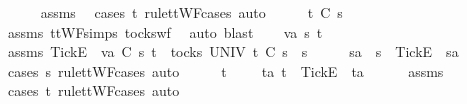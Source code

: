 \begin{isabellebody}
\ \ \ \ \isamarkupfalse%
\ assms{\isacharparenleft}{}{\isacharparenright}\ \isamarkupfalse%
\ {\isacharparenleft}cases\ t\ rule{\isacharcolon}ttWF{\isachardot}cases{\isacharcomma}\ auto{\isacharparenright}\isanewline
\ \ \isamarkupfalse%
\ \isamarkupfalse%
\ {\isachardoublequoteopen}t\ {\isasymle}\isactrlsub C\ s{}{\isacharprime}{\isachardoublequoteclose}\isanewline
\ \ \ \ \isamarkupfalse%
\ assms{\isacharparenleft}{}{\isacharparenright}\ ttWF{\isachardot}simps{\isacharparenleft}{}{\isacharparenright}\ tocks{\isacharunderscore}wf\ \isamarkupfalse%
\ {\isacharparenleft}auto{\isacharcomma}\ blast{\isacharparenright}\isanewline
{}\isamarkupfalse%
\isanewline
\ \ \isamarkupfalse%
\ va\ s{}{\isacharprime}\ t\isanewline
\ \ \isamarkupfalse%
\ assms{\isacharcolon}\ {\isachardoublequoteopen}{\isacharbrackleft}Tick{\isacharbrackright}\isactrlsub E\ {\isacharhash}\ va\ {\isasymsubseteq}\isactrlsub C\ s{}{\isacharprime}{\isachardoublequoteclose}\ {\isachardoublequoteopen}t\ {\isasymin}\ tocks\ UNIV{\isachardoublequoteclose}\ {\isachardoublequoteopen}t\ {\isasymle}\isactrlsub C\ s{}{\isacharprime}\ {\isacharat}\ s{}{\isachardoublequoteclose}\isanewline
\ \ \isamarkupfalse%
\ \isamarkupfalse%
\ s{}{\isacharprime}a\ \ {\isachardoublequoteopen}s{}{\isacharprime}\ {\isacharequal}\ {\isacharbrackleft}Tick{\isacharbrackright}\isactrlsub E\ {\isacharhash}\ s{}{\isacharprime}a{\isachardoublequoteclose}\isanewline
\ \ \ \ \isamarkupfalse%
\ {\isacharparenleft}cases\ s{}{\isacharprime}\ rule{\isacharcolon}ttWF{\isachardot}cases{\isacharcomma}\ auto{\isacharparenright}\isanewline
\ \ \isamarkupfalse%
\ \isamarkupfalse%
\ {\isachardoublequoteopen}t\ {\isacharequal}\ {\isacharbrackleft}{\isacharbrackright}\ {\isasymor}\ {\isacharparenleft}{\isasymexists}\ ta{\isachardot}\ t\ {\isacharequal}\ {\isacharbrackleft}Tick{\isacharbrackright}\isactrlsub E\ {\isacharhash}\ ta{\isacharparenright}{\isachardoublequoteclose}\isanewline
\ \ \ \ \isamarkupfalse%
\ assms{\isacharparenleft}{}{\isacharparenright}\ \isamarkupfalse%
\ {\isacharparenleft}cases\ t\ rule{\isacharcolon}ttWF{\isachardot}cases{\isacharcomma}\ auto{\isacharparenright}\isanewline
\ \ \isamarkupfalse%

\end{isabellebody}
